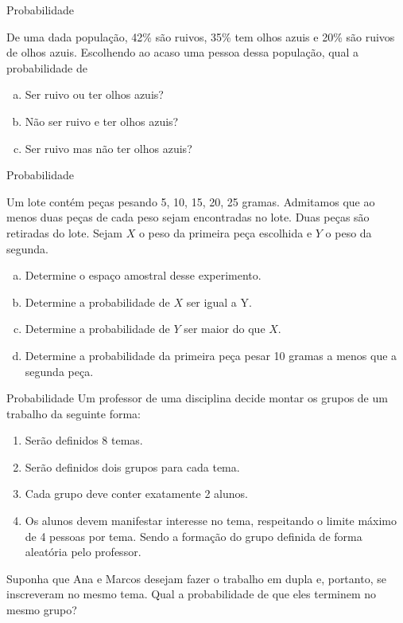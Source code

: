 \begin{frame}{Probabilidade}
    \begin{exemplo}
        De uma dada população, 42\% são ruivos, 35\% tem olhos azuis e 20\% são ruivos de olhos azuis. Escolhendo ao acaso uma pessoa dessa população, qual a probabilidade de
        \begin{enumerate}[a)] %
            \item Ser ruivo ou ter olhos azuis?
            \item Não ser ruivo e ter olhos azuis?
            \item Ser ruivo mas não ter olhos azuis?
        \end{enumerate}
    \end{exemplo}

\end{frame}

\begin{frame}{Probabilidade}
    \begin{exemplo}
        Um lote contém peças pesando 5, 10, 15, 20, 25 gramas. Admitamos que ao menos duas peças de cada peso sejam encontradas no lote. Duas peças são retiradas do lote. Sejam $X$ o peso da primeira peça escolhida e $Y$ o peso da segunda. 
        \begin{enumerate}[a)] %
            \item Determine o espaço amostral desse experimento.
            \item Determine a probabilidade de $X$ ser igual a Y.
            \item Determine a probabilidade de $Y$ ser maior do que $X$.
            \item Determine a probabilidade da primeira peça pesar 10 gramas a menos que a segunda peça.
        \end{enumerate}
    \end{exemplo}
\end{frame}

\begin{frame}{Probabilidade}
    Um professor de uma disciplina decide montar os grupos de um trabalho da seguinte forma:
    \begin{enumerate}
        \item Serão definidos 8 temas.
        \item Serão definidos dois grupos para cada tema. 
        \item Cada grupo deve conter exatamente 2 alunos. 
        \item Os alunos devem manifestar interesse no tema, respeitando o limite máximo de 4 pessoas por tema. Sendo a formação do grupo definida de forma aleatória pelo professor. 
    \end{enumerate}

    \pause

    Suponha que Ana e Marcos desejam fazer o trabalho em dupla e, portanto, se inscreveram no mesmo tema. Qual a probabilidade de que eles terminem no mesmo grupo?
\end{frame}

